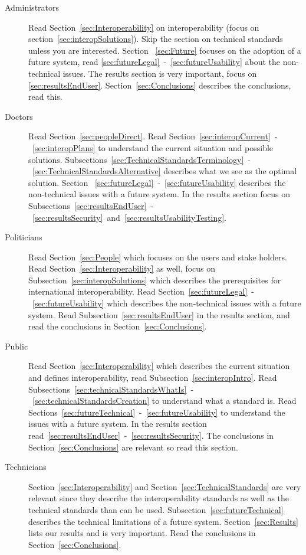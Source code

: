 \documentclass[14pt]{article}
\begin{document}
\begin{description}
\item[Administrators] Read Section~\ref{sec:Interoperability} on interoperability (focus on section~\ref{sec:interopSolutions}). Skip the section on technical standards unless you are interested. Section ~\ref{sec:Future} focuses on the adoption of a future system, read \ref{sec:futureLegal}~-~\ref{sec:futureUsability} about the non-technical issues. The results section is very important, focus on \ref{sec:resultsEndUser}. Section~\ref{sec:Conclusions} describes the conclusions, read this.
\item[Doctors] Read Section~\ref{sec:peopleDirect}. Read Section~\ref{sec:interopCurrent}~-~\ref{sec:interopPlans} to understand the current situation and possible solutions. Subsections~\ref{sec:TechnicalStandardsTerminology}~-~\ref{sec:TechnicalStandardsAlternative} describes what we see as the optimal solution. Section ~\ref{sec:futureLegal}~-~\ref{sec:futureUsability} describes the non-technical issues with a future system. In the results section focus on Subsections~\ref{sec:resultsEndUser}~-~\ref{sec:resultsSecurity}~and~\ref{sec:resultsUsabilityTesting}.
\item[Politicians] Read Section~\ref{sec:People} which focuses on the users and stake holders. Read Section~\ref{sec:Interoperability} as well, focus on Subsection~\ref{sec:interopSolutions} which describes the prerequisites for international interoperability. Read Section~\ref{sec:futureLegal}~-~\ref{sec:futureUsability} which describes the non-technical issues with a future system. Read Subsection~\ref{sec:resultsEndUser} in the results section, and read the conclusions in Section~\ref{sec:Conclusions}.
\item[Public] Read Section~\ref{sec:Interoperability} which describes the current situation and defines interoperability, read Subsection~\ref{sec:interopIntro}. Read Subsections~\ref{sec:technicalStandardsWhatIs}~-~\ref{sec:technicalStandardsCreation} to understand what a standard is. Read Sections~\ref{sec:futureTechnical}~-~\ref{sec:futureUsability} to understand the issues with a future system. In the results section read~\ref{sec:resultsEndUser}~-~\ref{sec:resultsSecurity}. The conclusions in Section~\ref{sec:Conclusions} are relevant so read this section.
\item[Technicians] Section~\ref{sec:Interoperability} and Section~\ref{sec:TechnicalStandards} are very relevant since they describe the interoperability standards as well as the technical standards than can be used. Subsection~\ref{sec:futureTechnical} describes the technical limitations of a future system. Section~\ref{sec:Results} lists our results and is very important. Read the conclusions in Section~\ref{sec:Conclusions}.
\end{description}
\end{document}
